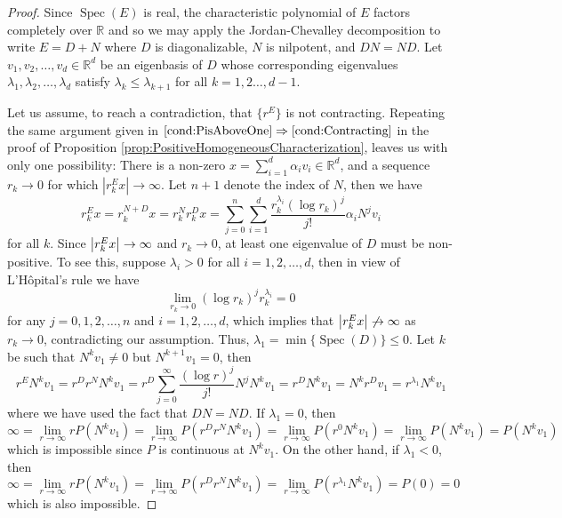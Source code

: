 \documentclass[11pt, letter]{book}
\newcommand\Spec{\operatorname{Spec}}
\newcommand\R{\mathbb{R}}
\newcommand{\f}[2]{\frac{#1}{#2}}
\begin{document}
\begin{proof}
Since $\Spec(E)$ is real, the characteristic polynomial of $E$ factors completely over $\R$ and so we may apply the Jordan-Chevalley decomposition to write $E=D+N$ where $D$ is diagonalizable, $N$ is nilpotent, and $DN=ND$. Let $v_1,v_2,\dots,v_d \in \R^d$ be an eigenbasis of $D$ whose corresponding eigenvalues $\lambda_1,\lambda_2,\dots,\lambda_d$ satisfy $\lambda_k\leq \lambda_{k+1}$ for all $k=1,2\dots,d-1$.

Let us assume, to reach a contradiction, 
that $\{ r^E \}$ is not contracting. Repeating the same argument given in $\ref{cond:PisAboveOne}\Rightarrow\ref{cond:Contracting}$ in the proof of Proposition \ref{prop:PositiveHomogeneousCharacterization}, leaves us with only one possibility: There is a non-zero $x = \sum^d_{i=1}\alpha_i v_i \in\mathbb{R}^d$, and a sequence $r_k\to 0$ for which $|r_k^E x|\to\infty$. Let $n+1$ denote the index of $N$, then we have
\begin{equation*}
r^E_k x = r_k^{N+D} x 
= r_k^N r_k^D x 
= \sum_{j=0}^n\sum_{i=1}^d \f{r_k^{\lambda_i}(\log r_k)^j}{j!}   \alpha_iN^j v_i
\end{equation*}
for all $k$. Since $\abs{r_k^E x} \to \infty$ and $r_k \to 0$, at least one eigenvalue of $D$ must be non-positive. To see this, suppose $\lambda_i > 0$ for all $i = 1,2,\dots,d$, then in view of L'H\^{o}pital's rule we have
\begin{equation*}
    \lim_{r_k \to 0}(\log r_k)^j r_k^{\lambda_i} = 0  
\end{equation*}
for any $j =0, 1,2,\dots,n$ and $i =1,2,\dots,d$, which implies that $\abs{r^E_k x} \not\to \infty$ as $r_k \to 0$, contradicting our assumption. Thus, $\lambda_1 = \min\{ \Spec(D)\} \leq 0$. Let $k$ be such that $N^k v_1 \neq 0$ but $N^{k+1} v_1 = 0$, then
\begin{equation*}
    r^E N^k v_1 = r^D r^N N^k v_1 = r^D \sum_{j=0}^\infty \f{(\log r)^j}{j!}N^j N^k v_1 = r^D N^k v_1 = N^k r^D  v_1 =  r^{\lambda_{1}} N^k  v_1
\end{equation*}
where we have used the fact that $DN = ND$. If $\lambda_1= 0$, then 
\begin{equation*}
    \infty =  \lim_{r\to \infty} rP(N^k v_1)  = \lim_{r\to \infty} P( r^D r^N N^k v_1) =  \lim_{r\to \infty}P(r^{0} N^k v_1)= \lim_{r\to \infty}P( N^k v_1) = P(N^k v_1)
\end{equation*}
which is impossible since $P$ is continuous at $N^k v_1$. On the other hand, if $\lambda_1 < 0$, then
\begin{equation*}
    \infty = \lim_{r\to \infty} rP(N^k v_1) = \lim_{r\to \infty} P(r^D r^N N^k v_1) = \lim_{r\to \infty}P(r^{\lambda_1} N^k v_1) = P(0) = 0
\end{equation*}
which is also impossible. 
\end{proof}
\end{document}
